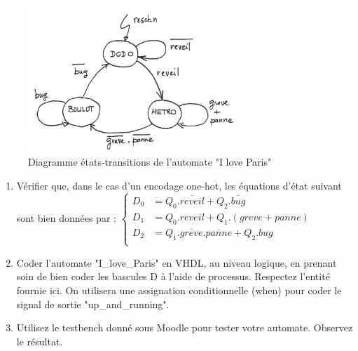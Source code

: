 \documentclass[a4paper,11pt]{article}
\begin{document}
\begin{figure}
  \centering
  \includegraphics[width=8cm]{./iloveparis.png}
  \caption{Diagramme états-transitions de l'automate "I love Paris"}
  \label{iloveparis}
\end{figure}

\begin{enumerate}
  \item Vérifier que, dans le cas d'un encodage one-hot, les équations d'état suivant sont bien données par :
  $\left\{
  \begin{array}{rl}
    D_0 &= Q_0.\overline{reveil}+Q_2.\overline{bug} \\
    D_1 &= Q_0.reveil+Q_1.(greve+panne)\\
    D_2 &= Q_1.\overline{greve}.\overline{panne}+Q_2.bug\\
  \end{array}
  \right.$

  \item Coder l'automate "I\_love\_Paris" en VHDL, au niveau logique, en prenant soin de bien coder les bascules D à l'aide de processus.
  Respectez l'entité fournie ici. On utilisera une assignation conditionnelle (when) pour coder le signal de sortie "up\_and\_running".
  \lstset{inputencoding=utf8}
  
  \item Utilisez le testbench donné sous Moodle pour tester votre automate. Observez le résultat.
\end{enumerate}


\lstset{inputencoding=utf8}

\end{document}
